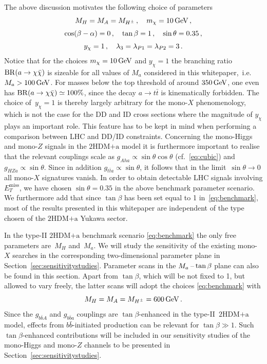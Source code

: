 \documentclass[a4paper, 11pt,notoc]{article}
\newcommand{\MET}{\ensuremath{E_T^\mathrm{miss}}\xspace}
\newcommand{\hdma}{\ensuremath{\textrm{2HDM+a}}\xspace}
\begin{document}
The above discussion motivates the following choice of parameters
\begin{gather} 
 M_H  = M_A = M_{H^\pm} \,, \quad m_\chi = 10 \, {\rm GeV} \,,\notag  \\[1mm]
\cos (\beta - \alpha) = 0\,, \quad   \tan \beta = 1\,, \quad  \sin\theta = 0.35\,, \label{eq:benchmark} \\[1mm]
y_\chi  = 1\,, \quad \lambda_3 =  \lambda_{P1} = \lambda_{P2} =3 \,. \notag 
\end{gather}
Notice that for the choices $m_\chi = 10 \, {\rm GeV}$ and $y_\chi  = 1$ the  branching ratio ${\rm BR} (a \to \chi \bar \chi)$ is sizeable for all values of $M_a$ considered in this whitepaper,~i.e.~$M_a > 100 \, {\rm GeV}$. For masses below the top threshold of around $350 \, {\rm GeV}$, one even has ${\rm BR} (a \to \chi \bar \chi) \simeq 100\%$, since the decay $a \to t \bar t$ is  kinematically forbidden.  The choice of~$y_\chi  = 1$ is thereby largely arbitrary for the mono-$X$ phenomenology, which is not the case for the DD and ID cross sections where the magnitude of $y_\chi$ plays an important role. This feature  has to be  kept in mind when performing a comparison between LHC and DD/ID constraints. Concerning the mono-Higgs and mono-$Z$ signals in the \hdma model it is furthermore important to realise that the relevant couplings scale as $g_{Aha} \propto \sin \theta \cos \theta$  (cf.~\eqref{eq:cubic}) and $g_{HZa} \propto \sin \theta$. Since in addition $g_{t \bar t a} \propto \sin \theta$,  it follows that in the limit~$\sin \theta \to 0$ all mono-$X$ signatures vanish. In order to obtain detectable LHC signals involving $\MET$, we have chosen $\sin\theta = 0.35$ in the above benchmark parameter scenario. We furthermore add that since $\tan \beta$ has been set equal to 1 in~\eqref{eq:benchmark}, most of the results presented in this whitepaper are independent of the type chosen of the \hdma Yukawa sector. 

In the  type-II \hdma  benchmark scenario \eqref{eq:benchmark} the only free parameters are~$M_H$ and~$M_a$. We will study the sensitivity of the existing mono-$X$ searches in the corresponding two-dimensional parameter plane in Section~\ref{sec:sensitivitystudies}. Parameter scans in the $M_a\hspace{0.5mm}$--$\hspace{0.5mm}\tan \beta$ plane can also be found in this section.  Apart from $\tan \beta$, which will be not fixed to 1, but allowed to vary freely, the latter  scans  will adopt the choices \eqref{eq:benchmark} with  
\begin{equation} \label{eq:matbscan}
M_H  = M_A = M_{H^\pm} =  600 \, {\rm GeV} \,.
\end{equation} 
Since the $g_{b \bar b A}$ and $g_{b \bar b a}$ couplings are $\tan \beta$-enhanced in the type-II~\hdma model,  effects from $b \bar b$-initiated production can be relevant  for $\tan \beta \gg 1$. Such $\tan \beta$-enhanced contributions will be included in our sensitivity studies of the mono-Higgs and mono-$Z$ channels to be presented in Section~\ref{sec:sensitivitystudies}. 
\end{document}
